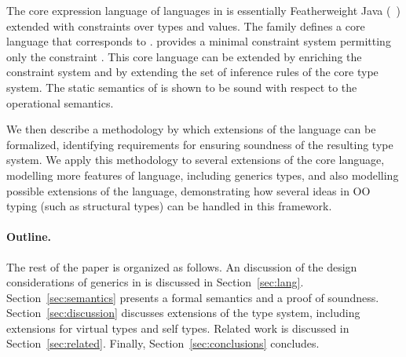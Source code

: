The core expression language of languages in \FXG is essentially
Featherweight Java (\FJ~\cite{FJ}) extended with constraints
over types and values.
The family defines a core language \FXGZ{} that corresponds to
\FGJ.  \FXGZ{} provides a minimal constraint system permitting
only the constraint .
This core language can be extended
by enriching the constraint system
and
by extending the set of inference rules of
the core type system.
The static semantics of \FXGZ{} is
shown to be sound with respect to the operational semantics.

We then describe a methodology by which extensions of the
language can be formalized, identifying requirements for
ensuring soundness of the resulting type system.  We apply this 
methodology to several extensions of the core language,
modelling more features of \Xten language, including generics
types, and also modelling possible extensions of the
\Xten language, demonstrating how several ideas in OO typing
(such as structural types) can be handled in this framework.


\paragraph{Outline.}

The rest of the paper is organized as follows.
%
An discussion of the design considerations of generics in \Xten{}
is discussed in Section~\ref{sec:lang}.
%
Section~\ref{sec:semantics} presents a formal semantics and a
proof of soundness.
%
Section~\ref{sec:discussion} discusses extensions of the type system,
including extensions for virtual types and self types.
%
Related work is discussed in Section~\ref{sec:related}.
%
Finally, Section~\ref{sec:conclusions} concludes.


